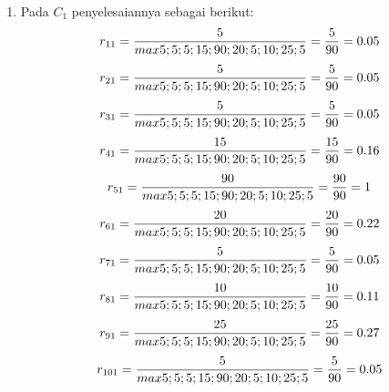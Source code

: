 \begin{enumerate}
	\item Pada $C_{1}$ penyelesaiannya sebagai berikut:
\begin{displaymath}
r_{11} = \frac{5}{max {5;5;5;15;90;20;5;10;25;5}} = \frac{5}{90} = 0.05\\
\end {displaymath}
\begin{displaymath}
r_{21} = \frac{5}{max {5;5;5;15;90;20;5;10;25;5}} = \frac{5}{90} = 0.05\\
\end{displaymath}
\begin{displaymath}
r_{31} = \frac{5}{max {5;5;5;15;90;20;5;10;25;5}} = \frac{5}{90} = 0.05\\
\end {displaymath}
\begin{displaymath}
r_{41} = \frac{15}{max {5;5;5;15;90;20;5;10;25;5}} = \frac{15}{90} = 0.16\\
\end {displaymath}
\begin{displaymath}
r_{51} = \frac{90}{max {5;5;5;15;90;20;5;10;25;5}} = \frac{90}{90} = 1\\
\end {displaymath}
\begin{displaymath}
r_{61} = \frac{20}{max {5;5;5;15;90;20;5;10;25;5}} = \frac{20}{90} = 0.22\\
\end {displaymath}
\begin{displaymath}
r_{71} = \frac{5}{max {5;5;5;15;90;20;5;10;25;5}} = \frac{5}{90} = 0.05\\
\end {displaymath}
\begin{displaymath}
r_{81} = \frac{10}{max {5;5;5;15;90;20;5;10;25;5}} = \frac{10}{90} = 0.11\\
\end {displaymath}
\begin{displaymath}
r_{91} = \frac{25}{max {5;5;5;15;90;20;5;10;25;5}} = \frac{25}{90} = 0.27\\
\end {displaymath}
\begin{displaymath}
r_{101} = \frac{5}{max {5;5;5;15;90;20;5;10;25;5}} = \frac{5}{90} = 0.05\\
\end {displaymath}


\end{enumerate}
